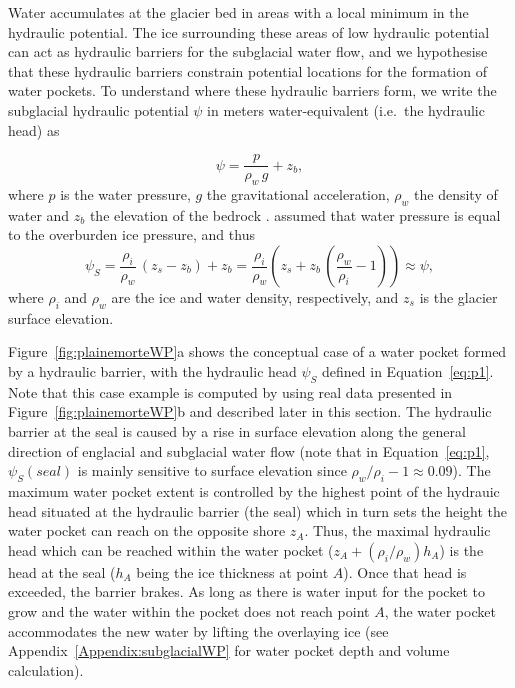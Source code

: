 Water accumulates at the glacier bed in areas with a local minimum in the hydraulic potential. The ice surrounding these areas of low hydraulic potential can act as hydraulic barriers for the subglacial water flow, and we hypothesise that these hydraulic barriers constrain potential locations for the formation of water pockets. To understand where these hydraulic barriers form, we write the subglacial hydraulic potential $\psi$ in meters water-equivalent (i.e.\ the hydraulic head) as

\begin{equation}
     \psi = \frac{p}{\rho_w\,g} + z_b,
     \label{eq:phi1}
\end{equation}
%
where $p$ is the water pressure, $g$ the gravitational acceleration, $\rho_w$ the density of water and $z_b$ the elevation of the bedrock \citep{Cuffey&Paterson2010}. \cite{Shreve1972} assumed that water pressure is equal to the overburden ice pressure, and thus
%
\begin{equation}
     \psi_S = \frac{\rho_i}{\rho_w}\,(z_s - z_b) + z_b = \frac{\rho_i}{\rho_w}\left(z_s + z_b\,\left(\frac{\rho_w}{\rho_i} - 1\right)\right) \approx \psi,
     \label{eq:p1}
\end{equation}
%
where $\rho_i$ and $\rho_w$ are the ice and water density, respectively, and $z_s$ is the glacier surface elevation. 

Figure~\ref{fig:plainemorteWP}a shows the conceptual case of a water pocket formed by a hydraulic barrier, with the hydraulic head $\psi_S$ defined in Equation~\ref{eq:p1}. Note that this case example is computed by using real data presented in Figure~\ref{fig:plainemorteWP}b and described later in this section. The hydraulic barrier at the seal is caused by a rise in surface elevation along the general direction of englacial and subglacial water flow (note that in Equation~\ref{eq:p1}, $\psi_S (seal)$ is mainly sensitive to surface elevation since $\rho_w/\rho_i - 1 \approx 0.09$). The maximum water pocket extent is controlled by the highest point of the hydrauic head situated at the hydraulic barrier (the seal) which in turn sets the height the water pocket can reach on the opposite shore $z_A$. Thus, the maximal hydraulic head which can be reached within the water pocket ($z_A + (\rho_i/\rho_w) h_A$) is the head at the seal ($h_A$ being the ice thickness at point $A$). Once that head is exceeded, the barrier brakes. As long as there is water input for the pocket to grow and the water within the pocket does not reach point $A$, the water pocket accommodates the new water by lifting the overlaying ice (see Appendix~\ref{Appendix:subglacialWP} for water pocket depth and volume calculation).

